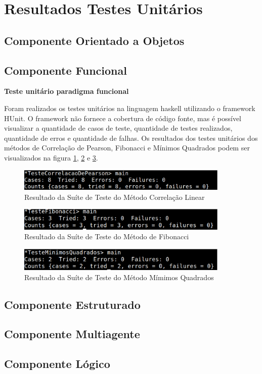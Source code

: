 \section{Resultados Testes Unitários}
\subsection{Componente Orientado a Objetos}
\subsection{Componente Funcional}
\textbf{Teste unitário paradigma funcional}

Foram realizados os testes unitários na linguagem haskell utilizando o framework HUnit. O framework não fornece a cobertura de código fonte, mas é possível visualizar a quantidade de casos de teste, quantidade de testes realizados, quantidade de erros e quantidade de falhas. Os resultados dos testes unitários dos métodos de Correlação de Pearson, Fibonacci e Mínimos Quadrados podem ser visualizados na figura \ref{testeCorrelacaoHaskell}, \ref{testeFibonacciHaskell} e \ref{TesteMinimosHaskell}.

\begin{figure}[H]
\centering
\includegraphics[width=0.9\textwidth]{figuras/testeCorrelacaoHaskell}
\caption{Resultado da Suíte de Teste do Método Correlação Linear}
\label{testeCorrelacaoHaskell}
\end{figure}

\begin{figure}[H]
\centering
\includegraphics[width=0.9\textwidth]{figuras/testeFibonacciHaskell}
\caption{Resultado da Suíte de Teste do Método de Fibonacci}
\label{testeFibonacciHaskell}
\end{figure}

\begin{figure}[H]
\centering
\includegraphics[width=0.9\textwidth]{figuras/TesteMinimosHaskell}
\caption{Resultado da Suíte de Teste do Método Mímimos Quadrados}
\label{TesteMinimosHaskell}
\end{figure}


\subsection{Componente Estruturado}

\subsection{Componente Multiagente}

\subsection{Componente Lógico}
